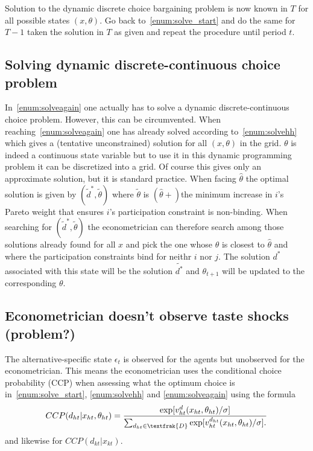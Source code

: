 \begin{enumerate}
\begin{enumerate}
\begin{enumerate}
\begin{enumerate}
\begin{itemize}
\end{itemize}
\end{enumerate}
\end{enumerate}
\end{enumerate}
\end{enumerate}
Solution to the dynamic discrete choice bargaining problem is now known in $T$ for all possible states $(x,\theta)$. Go back to~\cref{enum:solve_start} and do the same for $T-1$ taken the solution in $T$ as given and repeat the procedure until period $t$. 

\subsection{Solving dynamic discrete-continuous choice problem}
In~\cref{enum:solveagain} one actually has to solve a dynamic discrete-continuous choice problem. However, this can be circumvented. When reaching~\cref{enum:solveagain} one has already solved according to~\cref{enum:solvehh} which gives a (tentative unconstrained) solution for all $(x,\theta)$ in the grid. $\theta$ is indeed a continuous state variable but to use it in this dynamic programming problem it can be discretized into a grid. Of course this gives only an approximate solution, but it is standard practice. When facing $\hat{\theta}$ the optimal solution is given by $(\tilde{d}^*,\tilde{\theta})$ where $\tilde{\theta}$ is $(\hat{\theta} +)$the minimum increase in $i$'s Pareto weight that ensures $i$'s participation constraint is non-binding. When searching for $(\tilde{d}^*,\tilde{\theta})$ the econometrician can therefore search among those solutions already found for all $x$ and pick the one whose $\theta$ is closest to $\hat{\theta}$ and where the participation constraints bind for neithr $i$ nor $j$. The solution $d^*$ associated with this state will be the solution $\tilde{d^*}$ and $\theta_{t+1}$ will be updated to the corresponding $\theta$.

\subsection{Econometrician doesn't observe taste shocks (problem?)}
The alternative-specific state $\epsilon_t$ is observed for the agents but unobserved for the econometrician. This means the econometrician uses the conditional choice probability (CCP) when assessing what the optimum choice is in~\cref{enum:solve_start}, \cref{enum:solvehh} and \cref{enum:solveagain} using the formula
\begin{align*}
CCP(d_{ht}|x_{ht},\theta_{ht})=\frac{\exp[v_{ht}^{d}(x_{ht},\theta_{ht})/ \sigma]}{\sum_{d_{ht} \in \textfrak{D}} { \exp[v_{ht}^{d_{ht}}(x_{ht},\theta_{ht})/ \sigma].  }}
\end{align*}
and likewise for $CCP(d_{kt}|x_{kt})$. 

